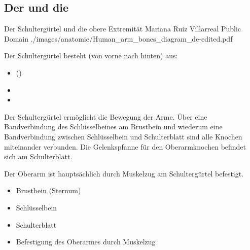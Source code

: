 \begin{Synopsis}
\end{Synopsis}

\subsection{Der  und die }
\label{topic:schulterguertel}


\Picture
{Der
Schultergürtel und die obere Extremität}%
{}%
{}%
{Mariana Ruiz Villarreal}%
{Public Domain}%
{./images/anatomie/Human_arm_bones_diagram_de-edited.pdf}%
{}%
{}%


{
Der Schultergürtel besteht (von vorne nach
hinten) aus:

\begin{itemize}
    \item {}
    ()
    \item {}
    \item {} 
\end{itemize}

Der Schultergürtel ermöglicht die Bewegung der Arme. Über
eine Bandverbindung des Schlüsselbeines am Brustbein und
wiederum eine Bandverbindung zwischen Schlüsselbein und
Schulterblatt sind alle Knochen miteinander verbunden. Die
Gelenkspfanne für den Oberarmknochen befindet sich am
Schulterblatt.

Der Oberarm ist hauptsächlich durch Muskelzug  am Schultergürtel
befestigt.
}
{
\begin{itemize}
    \item Brustbein (Sternum)
    \item Schlüsselbein 
    \item Schulterblatt 
    \item Befestigung des Oberarmes durch Muskelzug
\end{itemize}
}{}{}{}

\begin{Synopsis}
\end{Synopsis}




